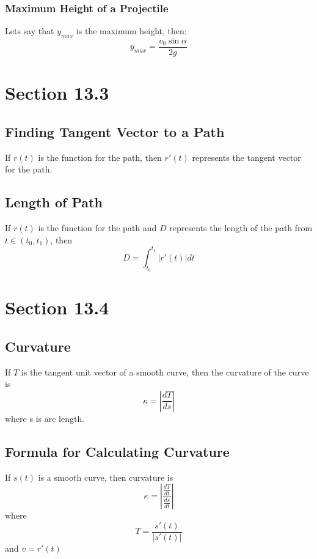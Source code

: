 \documentclass[12pt]{article}
\theoremstyle{break}
\numberwithin{theorem}{subsection}
\numberwithin{lemma}{subsection}
\numberwithin{corollary}{subsection}
\numberwithin{equation}{subsection}
\begin{document}
\subsubsection{Maximum Height of a Projectile}
Lets say that $y_{max}$ is the maximum height, then:
\begin{equation*}
	y_{max} = \frac{v_0 \sin \alpha}{2g}
\end{equation*}

\section{Section 13.3}

\subsection{Finding Tangent Vector to a Path}
If $r(t)$ is the function for the path, then $r'(t)$ represents the tangent vector for the path.

\subsection{Length of Path}
If $r(t)$ is the function for the path and $D$ represents the length of the path from $t \in (t_0, t_1)$,
then 
\begin{equation*}
	D = \int_{t_0}^{t_1} |r'(t)|dt
\end{equation*}

\section{Section 13.4}

\subsection{Curvature}
If $T$ is the tangent unit vector of a smooth curve, then the curvature of the curve is
\begin{equation*}
\kappa = \left| \frac{dT}{ds} \right|
\end{equation*}
where s is arc length.

\subsection{Formula for Calculating Curvature}
If $s(t)$ is a smooth curve, then curvature is 
\begin{equation*}
\kappa = \left| \frac{\frac{dT}{dt}}{\frac{ds}{dt}} \right|
\end{equation*}
where 
\begin{equation*}
T = \frac{s'(t)}{|s'(t)|}
\end{equation*}
and $v = r'(t)$
\end{document}
